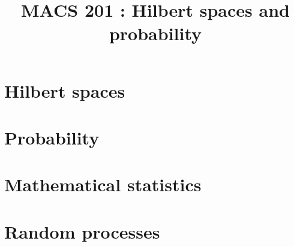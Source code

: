 \documentclass[a4paper,9pt]{article}
\title{\vspace{-1.2cm} \textbf{MACS 201 : Hilbert spaces and probability}}
\begin{document}
\maketitle

\vspace{-1.5cm}

\section{Hilbert spaces}

	

\section{Probability}

	

\section{Mathematical statistics}

	

\section{Random processes}

	
\end{document}
